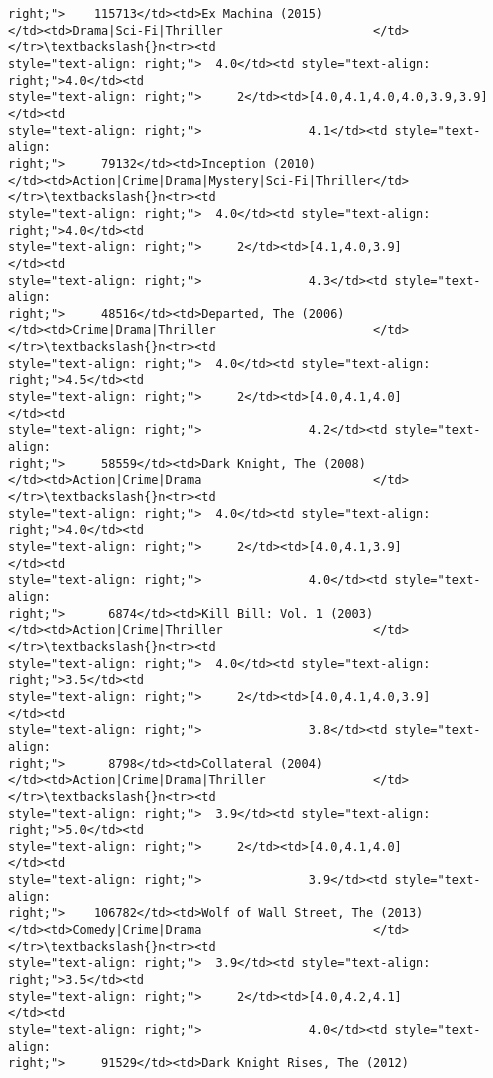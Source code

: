 \documentclass[11pt]{article}
\begin{document}
\begin{tcolorbox}[breakable, size=fbox, boxrule=.5pt, pad at break*=1mm, opacityfill=0]
\begin{Verbatim}[commandchars=\\\{\}]
right;">    115713</td><td>Ex Machina (2015)
</td><td>Drama|Sci-Fi|Thriller                     </td></tr>\textbackslash{}n<tr><td
style="text-align: right;">  4.0</td><td style="text-align: right;">4.0</td><td
style="text-align: right;">     2</td><td>[4.0,4.1,4.0,4.0,3.9,3.9]</td><td
style="text-align: right;">               4.1</td><td style="text-align:
right;">     79132</td><td>Inception (2010)
</td><td>Action|Crime|Drama|Mystery|Sci-Fi|Thriller</td></tr>\textbackslash{}n<tr><td
style="text-align: right;">  4.0</td><td style="text-align: right;">4.0</td><td
style="text-align: right;">     2</td><td>[4.1,4.0,3.9]            </td><td
style="text-align: right;">               4.3</td><td style="text-align:
right;">     48516</td><td>Departed, The (2006)
</td><td>Crime|Drama|Thriller                      </td></tr>\textbackslash{}n<tr><td
style="text-align: right;">  4.0</td><td style="text-align: right;">4.5</td><td
style="text-align: right;">     2</td><td>[4.0,4.1,4.0]            </td><td
style="text-align: right;">               4.2</td><td style="text-align:
right;">     58559</td><td>Dark Knight, The (2008)
</td><td>Action|Crime|Drama                        </td></tr>\textbackslash{}n<tr><td
style="text-align: right;">  4.0</td><td style="text-align: right;">4.0</td><td
style="text-align: right;">     2</td><td>[4.0,4.1,3.9]            </td><td
style="text-align: right;">               4.0</td><td style="text-align:
right;">      6874</td><td>Kill Bill: Vol. 1 (2003)
</td><td>Action|Crime|Thriller                     </td></tr>\textbackslash{}n<tr><td
style="text-align: right;">  4.0</td><td style="text-align: right;">3.5</td><td
style="text-align: right;">     2</td><td>[4.0,4.1,4.0,3.9]        </td><td
style="text-align: right;">               3.8</td><td style="text-align:
right;">      8798</td><td>Collateral (2004)
</td><td>Action|Crime|Drama|Thriller               </td></tr>\textbackslash{}n<tr><td
style="text-align: right;">  3.9</td><td style="text-align: right;">5.0</td><td
style="text-align: right;">     2</td><td>[4.0,4.1,4.0]            </td><td
style="text-align: right;">               3.9</td><td style="text-align:
right;">    106782</td><td>Wolf of Wall Street, The (2013)
</td><td>Comedy|Crime|Drama                        </td></tr>\textbackslash{}n<tr><td
style="text-align: right;">  3.9</td><td style="text-align: right;">3.5</td><td
style="text-align: right;">     2</td><td>[4.0,4.2,4.1]            </td><td
style="text-align: right;">               4.0</td><td style="text-align:
right;">     91529</td><td>Dark Knight Rises, The (2012)

\end{Verbatim}
\end{tcolorbox}
\end{document}

